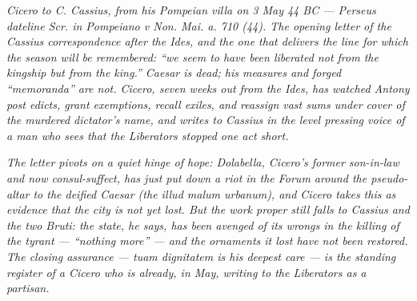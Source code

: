 
\textit{Cicero to C. Cassius, from his Pompeian villa on 3 May 44 BC ---
Perseus dateline \textit{Scr. in Pompeiano v Non. Mai. a. 710 (44)}.
The opening letter of the Cassius correspondence after the Ides, and the
one that delivers the line for which the season will be remembered:
``we seem to have been liberated not from the kingship but from the king.''
Caesar is dead; his measures and forged ``memoranda'' are not. Cicero,
seven weeks out from the Ides, has watched Antony post edicts, grant
exemptions, recall exiles, and reassign vast sums under cover of the
murdered dictator's name, and writes to Cassius in the level pressing
voice of a man who sees that the Liberators stopped one act short.}

\textit{The letter pivots on a quiet hinge of hope: Dolabella, Cicero's
former son-in-law and now consul-suffect, has just put down a riot in
the Forum around the pseudo-altar to the deified Caesar (the
\textit{illud malum urbanum}), and Cicero takes this as evidence that
the city is not yet lost. But the work proper still falls to Cassius
and the two Bruti: the state, he says, has been avenged of its wrongs
in the killing of the tyrant --- ``nothing more'' --- and the
ornaments it lost have not been restored. The closing assurance ---
\textit{tuam dignitatem} is his deepest care --- is the standing
register of a Cicero who is already, in May, writing to the
Liberators as a partisan.}
